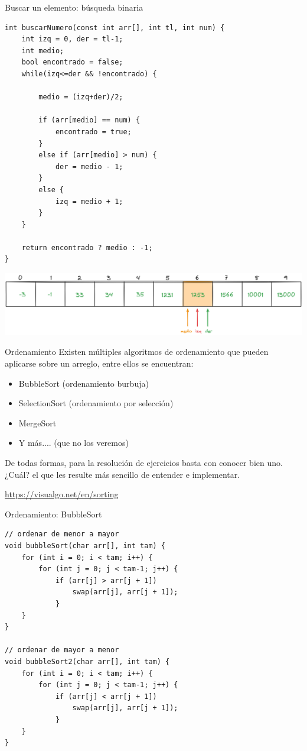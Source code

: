\documentclass[12pt]{beamer}
\begin{document}
\begin{frame}[fragile]{Buscar un elemento: búsqueda binaria}
\begin{lstlisting}[basicstyle=\tiny]
int buscarNumero(const int arr[], int tl, int num) {
    int izq = 0, der = tl-1;
    int medio;
    bool encontrado = false;
    while(izq<=der && !encontrado) {
        
        medio = (izq+der)/2;
        
        if (arr[medio] == num) {
            encontrado = true;
        }
        else if (arr[medio] > num) {
            der = medio - 1;
        }
        else {
            izq = medio + 1;
        }
    }
    
    return encontrado ? medio : -1;
}
\end{lstlisting}
    \includegraphics[width=\textwidth]{busqueda_binaria_final.png}
\end{frame}

\begin{frame}{Ordenamiento}
    Existen múltiples algoritmos de ordenamiento que pueden aplicarse sobre un arreglo, entre ellos se encuentran:
    \begin{itemize}
        \item BubbleSort (ordenamiento burbuja)
        \item SelectionSort (ordenamiento por selección)
        \item MergeSort
        \item Y más.... (que no los veremos)
    \end{itemize} 
    De todas formas, para la resolución de ejercicios basta con conocer bien uno. ¿Cuál? el que les resulte más sencillo de entender e implementar.

    \medskip

    \begin{center}
        \url{https://visualgo.net/en/sorting}
    \end{center}
\end{frame}

\begin{frame}[fragile]{Ordenamiento: BubbleSort}
\begin{lstlisting}[basicstyle=\scriptsize]
// ordenar de menor a mayor
void bubbleSort(char arr[], int tam) {
    for (int i = 0; i < tam; i++) {
        for (int j = 0; j < tam-1; j++) {
            if (arr[j] > arr[j + 1])
                swap(arr[j], arr[j + 1]);
            }
    }
}

// ordenar de mayor a menor
void bubbleSort2(char arr[], int tam) {
    for (int i = 0; i < tam; i++) {
        for (int j = 0; j < tam-1; j++) {
            if (arr[j] < arr[j + 1])
                swap(arr[j], arr[j + 1]);
            }
    }
}
\end{lstlisting}
\end{frame}
\end{document}
